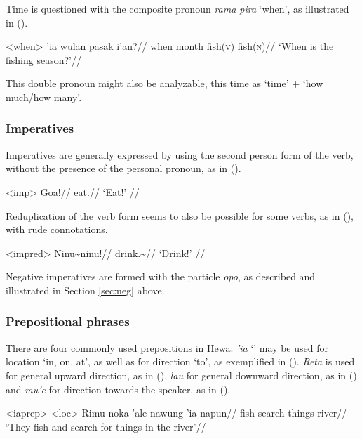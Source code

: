 \documentclass[../hewa_main-subfiles.tex]{subfiles}
\begin{document}
Time is questioned with the composite pronoun \textit{rama pira} `when', as illustrated in ().

\ex<when>
\begingl %
 'ia wulan pasak i'an?//
\glb when \Loc{} month fish(\textsc{v}) fish(\textsc{n})//
\glft `When is the fishing season?'// 
\endgl
\xe

This double pronoun might also be analyzable, this time as `time' + `how much/how many'.

\subsubsection{Imperatives}

Imperatives are generally expressed by using the second person form of the verb, without the presence of the personal pronoun, as in ().

\ex<imp>
\begingl %
\gla Goa!//
\glb eat.\Second{}\Sg{}//
\glft `Eat!' //
\endgl
\xe

Reduplication of the verb form seems to also be possible for some verbs, as in (), with rude connotations.

\ex<impred>
\begingl %
\gla Ninu\textasciitilde ninu!//
\glb drink.\Second{}\Sg{}\textasciitilde \Rdp{}//
\glft `Drink!' // 
\endgl
\xe

Negative imperatives are formed with the particle \textit{opo}, as described and illustrated in Section \ref{sec:neg} above.

\subsubsection{Prepositional phrases}\label{sec:prep}

There are four commonly used prepositions in Hewa: \textit{'ia} `\Loc{}' may be used for location `in, on, at', as well as for direction `to', as exemplified in (). \textit{Reta} is used for general upward direction, as in (), \textit{lau} for general downward direction, as in () and \textit{mu'e} for direction towards the speaker, as in ().

\pex<iaprep> %
\a<loc> %
\begingl %
\gla Rimu noka 'ale nawung 'ia napun//
\glb \Third{}\Pl{} fish search things \Loc{} river//
\glft `They fish and search for things in the river'//
\endgl
\end{document}
